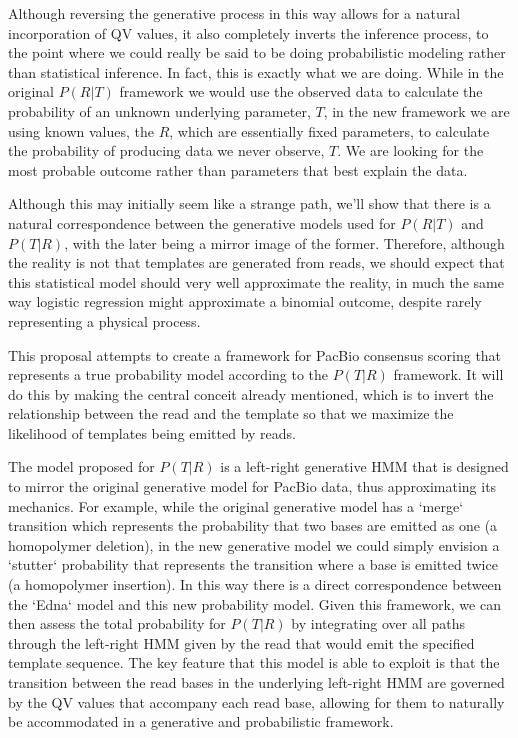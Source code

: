 \documentclass[fleqn,10pt]{SelfArx} %
\begin{document}
Although reversing the generative process in this way allows for a natural incorporation of QV values, it also completely inverts the inference process, to the point where we could really be said to be doing probabilistic modeling rather than statistical inference.  In fact, this is exactly what we are doing.  While in the original $P(R|T)$ framework we would use the observed data to calculate the probability of an unknown underlying parameter, $T$, in the new framework we are using known values, the $R$, which are essentially fixed parameters, to calculate the probability of producing data we never observe, $T$.  We are looking for the most probable outcome rather than parameters that best explain the data.

Although this may initially seem like a strange path, we'll show that there is a natural correspondence between the generative models used for $P(R|T)$ and $P(T|R)$, with the later being a mirror image of the former.  Therefore, although the reality is not that templates are generated from reads, we should expect that this statistical model should very well approximate the reality, in much the same way logistic regression might approximate a binomial outcome, despite rarely representing a physical process.

This proposal attempts to create a framework for PacBio consensus scoring that represents a true probability model according to the $P(T|R)$ framework.  It will do this by making the central conceit already mentioned, which is to invert the relationship between the read and the template so that we maximize the likelihood of templates being emitted by reads.

The model proposed for $P(T|R)$ is a left-right generative HMM that is designed to mirror the original generative model for PacBio data, thus approximating its mechanics.  For example, while the original generative model has a `merge` transition which represents the probability that two bases are emitted as one (a homopolymer deletion), in the new generative model we could simply envision a `stutter` probability that represents the transition where a base is emitted twice (a homopolymer insertion).  In this way there is a direct correspondence between the `Edna` model and this new probability model.  Given this framework, we can then assess the total probability for $P(T|R)$ by integrating over all paths through the left-right HMM given by the read that would emit the specified template sequence.  The key feature that this model is able to exploit is that the transition between the read bases in the underlying left-right HMM are governed by the QV values that accompany each read base, allowing for them to naturally be accommodated in a generative and probabilistic framework.  
\end{document}
